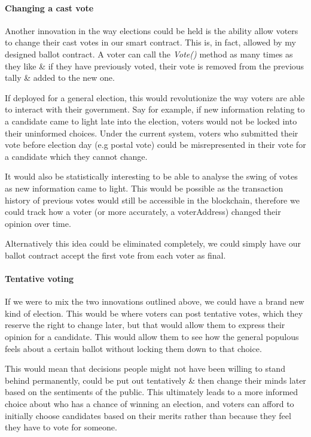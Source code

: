 \documentclass{article}
\begin{document}
\paragraph{Changing a cast vote}
\hfill \break
Another innovation in the way elections could be held is the ability allow voters to change their cast votes in our smart contract. This is, in fact, allowed by my designed ballot contract. A voter can call the \textit{Vote()} method as many times as they like \& if they have previously voted, their vote is removed from the previous tally \& added to the new one.

If deployed for a general election, this would revolutionize the way voters are able to interact with their government. Say for example, if new information relating to a candidate came to light late into the election, voters would not be locked into their uninformed choices. Under the current system, voters who submitted their vote before election day (e.g postal vote) could be misrepresented in their vote for a candidate which they cannot change.

It would also be statistically interesting to be able to analyse the swing of votes as new information came to light. This would be possible as the transaction history of previous votes would still be accessible in the blockchain, therefore we could track how a voter (or more accurately, a voterAddress) changed their opinion over time.

Alternatively this idea could be eliminated completely, we could simply have our ballot contract accept the first vote from each voter as final.

\paragraph{Tentative voting}
\hfill \break
If we were to mix the two innovations outlined above, we could have a brand new kind of election. This would be where voters can post tentative votes, which they reserve the right to change later, but that would allow them to express their opinion for a candidate. This would allow them to see how the general populous feels about a certain ballot without locking them down to that choice.

This would mean that decisions people might not have been willing to stand behind permanently, could be put out tentatively \& then change their minds later based on the sentiments of the public. This ultimately leads to a more informed choice about who has a chance of winning an election, and voters can afford to initially choose candidates based on their merits rather than because they feel they have to vote for someone.
\end{document}
